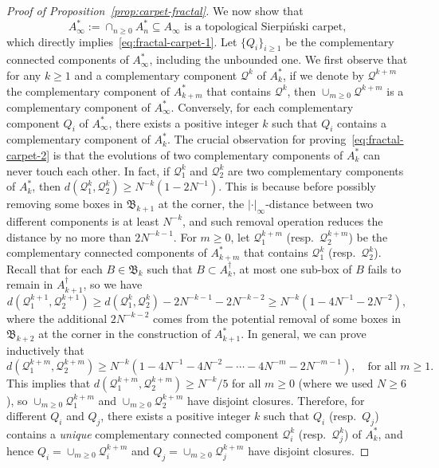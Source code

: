 \documentclass[a4paper]{article}
\numberwithin{equation}{section}
\numberwithin{equation}{section}
\renewcommand{\1}{\mathbf{1}}
\begin{document}
\begin{proof}[Proof of Proposition~\ref{prop:carpet-fractal}]
    We now show that
    \begin{equation}\label{eq:fractal-carpet-2}
        A_\infty^*:=\cap_{n \ge 0} A_n^* \subseteq A_\infty  \mbox{ is a topological Sierpi\'nski carpet,}
    \end{equation}
    which directly implies~\eqref{eq:fractal-carpet-1}.
    Let $\{Q_i\}_{i \ge 1}$ be the complementary connected components of $A_\infty^*$, including the unbounded one. We first observe that for any $k \ge 1$ and a complementary component $\mathcal Q^k$ of $A_k^*$, if we denote by $\mathcal Q^{k+m}$ the complementary component of $A_{k+m}^*$ that contains $\mathcal Q^k$, then $\cup_{m \ge 0} \mathcal Q^{k+m}$ is a complementary component of $A_\infty^*$. Conversely, for each complementary component $Q_i$ of $A_\infty^*$, there exists a positive integer $k$ such that $Q_i$ contains a complementary component of $A_k^*$. The crucial observation for proving~\eqref{eq:fractal-carpet-2} is that the evolutions of two complementary components of $A_k^*$ can never touch each other. In fact, if $\mathcal Q_1^k$ and $\mathcal Q_2^k$ are two complementary components of $A_k^*$, then $d(\mathcal Q_1^k,\mathcal Q_2^k) \ge N^{-k}(1-2N^{-1})$. This is because before possibly removing some boxes in $\mathfrak B_{k+1}$ at the corner, the $|\cdot|_\infty$-distance between two different components is at least $N^{-k}$, and such removal operation reduces the distance by no more than $2N^{-k-1}$.
    For $m \ge 0$, let $\mathcal Q_1^{k+m}$ (resp.\ $\mathcal Q_2^{k+m}$) be the complementary connected components of $A_{k+m}^*$ that contains $\mathcal Q_1^k$ (resp.\ $\mathcal Q_2^k$). Recall that for each $B \in \mathfrak B_k$ such that $B \subset A_k^\dagger$, at most one sub-box of $B$ fails to remain in $A_{k+1}^\dagger$, so we have
    \[ d(\mathcal Q_1^{k+1},\mathcal Q_2^{k+1}) \ge d(\mathcal Q_1^k,\mathcal Q_2^k)-2N^{-k-1}-2N^{-k-2} \ge N^{-k}(1-4N^{-1}-2N^{-2}), \]
    where the additional $2N^{-k-2}$ comes from the potential removal of some boxes in $\mathfrak B_{k+2}$ at the corner in the construction of $A_{k+1}^*$. In general, we can prove inductively that
    \[ d(\mathcal Q_1^{k+m},\mathcal Q_2^{k+m}) \ge N^{-k}(1-4N^{-1}-4N^{-2}-\cdots-4N^{-m}-2N^{-m-1}), \quad \mbox{for all } m \ge 1. \]
    This implies that $d(\mathcal Q_1^{k+m},\mathcal Q_2^{k+m}) \ge N^{-k}/5$ for all $m \ge 0$ (where we used $N \geq 6$), so $\cup_{m \ge 0} \mathcal Q_1^{k+m}$ and $\cup_{m \ge 0} \mathcal Q_2^{k+m}$ have disjoint closures.
    Therefore, for different $Q_i$ and $Q_j$, there exists a positive integer $k$ such that $Q_i$ (resp.\ $Q_j$) contains a \emph{unique} complementary connected component $\mathcal Q_i^k$ (resp.\ $\mathcal Q_j^k$) of $A_k^*$, and hence $Q_i=\cup_{m \ge 0} \mathcal Q_i^{k+m}$ and $Q_j=\cup_{m \ge 0} \mathcal Q_j^{k+m}$ have disjoint closures.

\end{proof}
\end{document}
